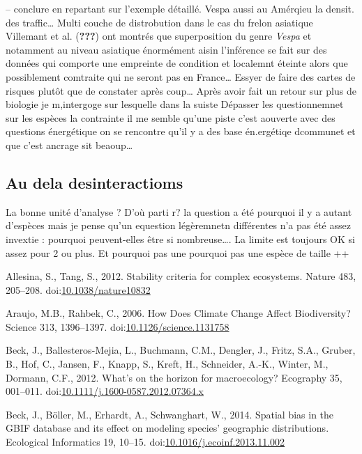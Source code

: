 -- conclure en repartant sur l'exemple détaillé. Vespa aussi au Amérqieu
la densit. des traffic\ldots{} Multi couche de distrobution dans le cas
du frelon asiatique Villemant et al. ({\textbf{???}}) ont montrés que
superposition du genre \emph{Vespa} et notamment au niveau asiatique
énormément aisin l'inférence se fait sur des données qui comporte une
empreinte de condition et localemnt éteinte alors que possiblement
comtraite qui ne seront pas en France\ldots{} Essyer de faire des cartes
de risques plutôt que de constater après coup\ldots{} Après avoir fait
un retour sur plus de biologie je m,intergoge sur lesquelle dans la
suiste Dépasser les questionnemnet sur les espèces la contrainte il me
semble qu'une piste c'est aouverte avec des questions énergétique on se
rencontre qu'il y a des base én.ergétiqe dcommunet et que c'est ancrage
sit beaoup\ldots{}

\subsection{Au dela desinteractioms}\label{au-dela-desinteractioms}

La bonne unité d'analyse ? D'où parti r? la question a été pourquoi il y
a autant d'espèces mais je pense qu'un equestion légèremnetn différentes
n'a pas été assez invextie : pourquoi peuvent-elles être si
nombreuse\ldots{}. La limite est toujours OK si assez pour 2 ou plus. Et
pourquoi pas une pourquoi pas une espèce de taille ++

\hypertarget{refs}{}
\hypertarget{ref-Allesina2012a}{}
Allesina, S., Tang, S., 2012. Stability criteria for complex ecosystems.
Nature 483, 205--208.
doi:\href{https://doi.org/10.1038/nature10832}{10.1038/nature10832}

\hypertarget{ref-Araujo2006}{}
Araujo, M.B., Rahbek, C., 2006. How Does Climate Change Affect
Biodiversity? Science 313, 1396--1397.
doi:\href{https://doi.org/10.1126/science.1131758}{10.1126/science.1131758}

\hypertarget{ref-Beck2012}{}
Beck, J., Ballesteros-Mejia, L., Buchmann, C.M., Dengler, J., Fritz,
S.A., Gruber, B., Hof, C., Jansen, F., Knapp, S., Kreft, H., Schneider,
A.-K., Winter, M., Dormann, C.F., 2012. What's on the horizon for
macroecology? Ecography 35, 001--011.
doi:\href{https://doi.org/10.1111/j.1600-0587.2012.07364.x}{10.1111/j.1600-0587.2012.07364.x}

\hypertarget{ref-Beck2014a}{}
Beck, J., Böller, M., Erhardt, A., Schwanghart, W., 2014. Spatial bias
in the GBIF database and its effect on modeling species' geographic
distributions. Ecological Informatics 19, 10--15.
doi:\href{https://doi.org/10.1016/j.ecoinf.2013.11.002}{10.1016/j.ecoinf.2013.11.002}

